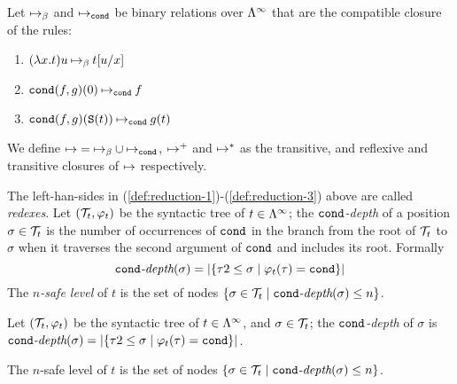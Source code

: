 \begin{definition}\label{def:reduction}
Let $\mathbin{\mapsto}_\beta$ and $\mathbin{\mapsto}_{\tt cond}$ be binary relations over $\Lambda^\infty$ that are the compatible closure of the rules:

\begin{enumerate}
\item \label{def:reduction-1} $(\lambda x.t)u \mathbin{\mapsto}_\beta t[u/x]$
\item \label{def:reduction-2} ${\tt cond}(f,g)(0) \mathbin{\mapsto}_{\tt cond} f$
\item \label{def:reduction-3} ${\tt cond}(f,g)({\tt S} (t)) \mathbin{\mapsto}_{\tt cond} g(t)$
\end{enumerate}
We define $\mathbin{\mapsto} = \mathbin{\mapsto}_\beta \cup \mathbin{\mapsto}_{\tt cond}$, $\mathbin{\mapsto}^+$ and $\mathbin{\mapsto}^*$ as the transitive, and reflexive and transitive
closures of $\mathbin{\mapsto}$ respectively.
\end{definition}

The left-han-sides in (\ref{def:reduction-1})-(\ref{def:reduction-3}) above are called {\em redexes}.
Let $({\cal T}_t, \varphi_t)$ be the syntactic tree of $t\in \Lambda^\infty$;
the {\em ${\tt cond}$-depth} of a position $\sigma \in {\cal T}_t$ is the number of occurrences of ${\tt cond}$ 
in the branch from the root of ${\cal T}_t$ to $\sigma$ when it traverses the second argument of ${\tt cond}$ and includes its root.
Formally
\[\textit{${\tt cond}$-depth}(\sigma) = |\{ \tau 2 \leq \sigma \mid \varphi_t(\tau) = {\tt cond} \}|\]
The {\em $n$-safe level} of $t$ is the set of nodes $\{ \sigma \in {\cal T}_t \mid \textit{${\tt cond}$-depth}(\sigma) \leq n \}$.

\begin{definition}\label{def:n-safe}
Let $({\cal T}_t, \varphi_t)$ be the syntactic tree of $t\in \Lambda^\infty$, and $\sigma \in {\cal T}_t$; the {\em ${\tt cond}$-depth} of
$\sigma$ is $\textit{${\tt cond}$-depth}(\sigma) = |\{ \tau 2 \leq \sigma \mid \varphi_t(\tau) = {\tt cond} \}|$. 

The $n$-safe level of $t$ is the set of nodes $\{ \sigma \in {\cal T}_t \mid \textit{${\tt cond}$-depth}(\sigma) \leq n \}$.
\end{definition}

